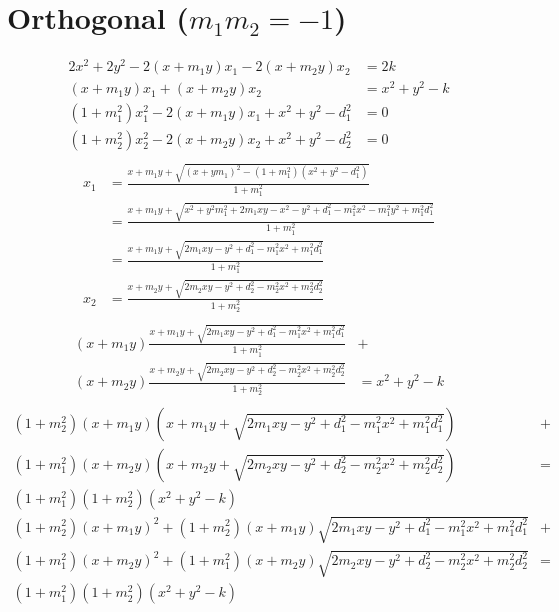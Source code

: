 \documentclass{article}
\begin{document}
\section{Orthogonal ($m_1 m_2 = -1$)}
\begin{align*}
  2 x^2 + 2 y^2 - 2 (x + m_1 y) x_1 - 2 (x + m_2 y) x_2 &= 2 k\\
  (x + m_1 y) x_1 + (x + m_2 y) x_2 &= x^2 + y^2 - k\\
  (1 + m_1^2) x_1^2 - 2 (x + m_1 y) x_1  + x^2 + y^2 - d_1^2 &= 0\\
  (1 + m_2^2) x_2^2 - 2 (x + m_2 y) x_2  + x^2 + y^2 - d_2^2 &= 0\\
\end{align*}
\begin{align*}
  x_1 &= \frac{x + m_1 y + \sqrt{(x + y m_1)^2 - (1 + m_1^2)(x^2 + y^2 - d_1^2)}}{1 + m_1^2}\\
      &= \frac{x + m_1 y + \sqrt{x^2 + y^2 m_1^2 + 2 m_1 x y - x^2 - y^2 + d_1^2 - m_1^2 x^2 - m_1^2 y^2 + m_1^2 d_1^2}}{1 + m_1^2}\\
      &= \frac{x + m_1 y + \sqrt{2 m_1 x y - y^2 + d_1^2 - m_1^2 x^2 + m_1^2 d_1^2}}{1 + m_1^2}\\
  x_2 &= \frac{x + m_2 y + \sqrt{2 m_2 x y - y^2 + d_2^2 - m_2^2 x^2 + m_2^2 d_2^2}}{1 + m_2^2}\\
\end{align*}
\begin{align*}
  (x + m_1 y) \frac{x + m_1 y + \sqrt{2 m_1 x y - y^2 + d_1^2 - m_1^2 x^2 + m_1^2 d_1^2}}{1 + m_1^2} &+ \\
  (x + m_2 y) \frac{x + m_2 y + \sqrt{2 m_2 x y - y^2 + d_2^2 - m_2^2 x^2 + m_2^2 d_2^2}}{1 + m_2^2} &= x^2 + y^2 - k\\
\end{align*}
\begin{align*}
  (1 + m_2^2)(x + m_1 y)(x + m_1 y + \sqrt{2 m_1 x y - y^2 + d_1^2 - m_1^2 x^2 + m_1^2 d_1^2}) &+ \\
  (1 + m_1^2)(x + m_2 y)(x + m_2 y + \sqrt{2 m_2 x y - y^2 + d_2^2 - m_2^2 x^2 + m_2^2 d_2^2}) &= \\
  (1 + m_1^2)(1 + m_2^2)(x^2 + y^2 - k)\\
  (1 + m_2^2)(x + m_1 y)^2 + (1 + m_2^2)(x + m_1 y)\sqrt{2 m_1 x y - y^2 + d_1^2 - m_1^2 x^2 + m_1^2 d_1^2} &+ \\
  (1 + m_1^2)(x + m_2 y)^2 + (1 + m_1^2)(x + m_2 y)\sqrt{2 m_2 x y - y^2 + d_2^2 - m_2^2 x^2 + m_2^2 d_2^2} &= \\
  (1 + m_1^2)(1 + m_2^2)(x^2 + y^2 - k)\\
\end{align*}
\end{document}
